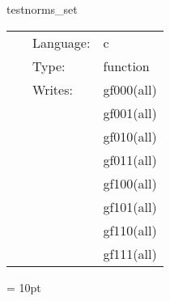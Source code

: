 \vspace{5mm}


\hspace{5mm} testnorms\_set 

\hspace{5mm}{\it set up test data } 


\hspace{5mm}

 \begin{tabular*}{160mm}{cll} 
~ & Language:  & c \\ 
~ & Type:  & function \\ 
~ & Writes:  & gf000(all) \\ 
~& ~ &gf001(all)\\ 
~& ~ &gf010(all)\\ 
~& ~ &gf011(all)\\ 
~& ~ &gf100(all)\\ 
~& ~ &gf101(all)\\ 
~& ~ &gf110(all)\\ 
~& ~ &gf111(all)\\ 
\end{tabular*} 



\vspace{5mm}\parskip = 10pt 
